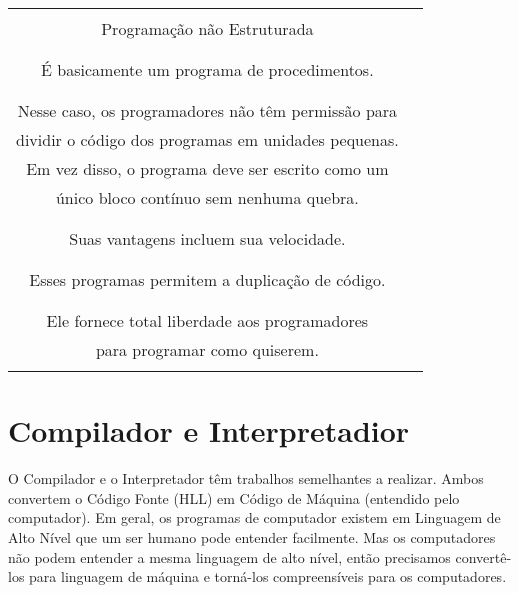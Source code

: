 \documentclass[12pt,a4paper]{abntex2}
\begin{document}
\begin{table}%
    \begin{tabular}{|c|c|} \hline \\
    Programação não Estruturada \\\\ \hline \\
    É basicamente um programa de procedimentos. \\ \\\hdashline \\
    Nesse caso, os programadores não têm permissão para\\
    dividir o código dos programas em unidades pequenas.\\
    Em vez disso, o programa deve ser escrito como um\\
    único bloco contínuo sem nenhuma quebra. \\ \\\hdashline \\
    Suas vantagens incluem sua velocidade. \\ \\\hdashline \\
    Esses programas permitem a duplicação de código.  \\ \\\hdashline \\
    Ele fornece total liberdade aos programadores \\
    para programar como quiserem. \\ \\\hline

    \end{tabular}
\end{table}

\vspace{5cm}


\section{Compilador e Interpretadior}
O Compilador e o Interpretador têm trabalhos semelhantes a realizar.
Ambos convertem o Código Fonte (HLL) em Código de Máquina (entendido pelo computador).
Em geral, os programas de computador existem em Linguagem de Alto Nível que um ser humano
pode entender facilmente. Mas os computadores não podem entender a mesma linguagem de
alto nível, então precisamos convertê-los para linguagem de máquina e torná-los compreensíveis
para os computadores.
\end{document}
